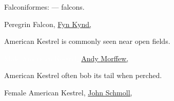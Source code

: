 \documentclass[t]{beamer}
\begin{document}
{
\begin{frame}{Falconiformes:  — falcons.}


\tinyfill Peregrin Falcon, \href{https://flickr.com/photos/79452129@N02/21571335442}{Fyn Kynd, }
\end{frame}
}

{
\begin{frame}{American Kestrel is commonly seen near open fields.}



\tinyfill \textcolor{white}{Male American Kestrel, %
 \href{https://commons.wikimedia.org/wiki/File:American_Kestrel_(Male)_(8238822396).jpg}{Andy Morffew, }}
\end{frame}
}

{
\begin{frame}{American Kestrel often bob its tail when perched.}



\tinyfill Female American Kestrel, %
 \href{https://flickr.com/photos/jls195674/16558905212}{John Schmoll, }
\end{frame}
}
\end{document}

